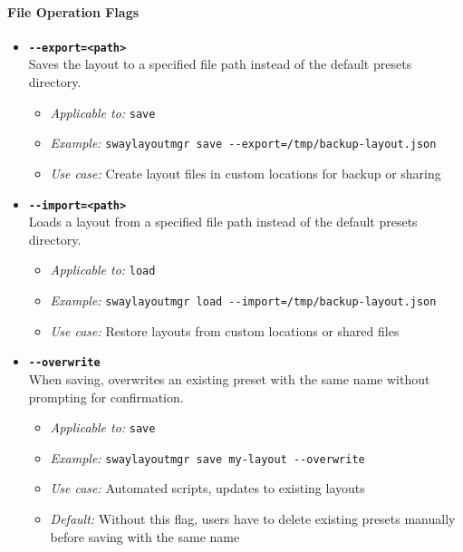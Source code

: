 \paragraph{File Operation Flags}

\begin{itemize}
    \item \textbf{\texttt{-{}-export=<path>}} \\
    Saves the layout to a specified file path instead of the default presets directory.
    \begin{itemize}
        \item \textit{Applicable to:} \texttt{save}
        \item \textit{Example:} \texttt{swaylayoutmgr save -{}-export=/tmp/backup-layout.json}
        \item \textit{Use case:} Create layout files in custom locations for backup or sharing
    \end{itemize}

    \item \textbf{\texttt{-{}-import=<path>}} \\
    Loads a layout from a specified file path instead of the default presets directory.
    \begin{itemize}
        \item \textit{Applicable to:} \texttt{load}
        \item \textit{Example:} \texttt{swaylayoutmgr load -{}-import=/tmp/backup-layout.json}
        \item \textit{Use case:} Restore layouts from custom locations or shared files
    \end{itemize}

    \item \textbf{\texttt{-{}-overwrite}} \\
    When saving, overwrites an existing preset with the same name without prompting for confirmation.
    \begin{itemize}
        \item \textit{Applicable to:} \texttt{save}
        \item \textit{Example:} \texttt{swaylayoutmgr save my-layout -{}-overwrite}
        \item \textit{Use case:} Automated scripts, updates to existing layouts
        \item \textit{Default:} Without this flag, users have to delete existing presets manually before saving with the same name
    \end{itemize}
\end{itemize}

